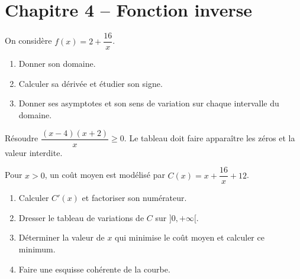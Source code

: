 \section*{Chapitre 4 -- Fonction inverse}
\begin{exercice}
On considère $f(x)=2+\dfrac{16}x$.
\begin{enumerate}
\item Donner son domaine.
\item Calculer sa dérivée et étudier son signe.
\item Donner ses asymptotes et son sens de variation sur chaque intervalle du domaine.
\end{enumerate}
\end{exercice}
\begin{exercice}
Résoudre $\dfrac{(x-4)(x+2)}x\geq0$. Le tableau doit faire apparaître les zéros et la valeur interdite.
\end{exercice}
\begin{exercice}
Pour $x>0$, un coût moyen est modélisé par $C(x)=x+\dfrac{16}x+12$.
\begin{enumerate}
\item Calculer $C'(x)$ et factoriser son numérateur.
\item Dresser le tableau de variations de $C$ sur $]0,+\infty[$.
\item Déterminer la valeur de $x$ qui minimise le coût moyen et calculer ce minimum.
\item Faire une esquisse cohérente de la courbe.
\end{enumerate}
\end{exercice}

